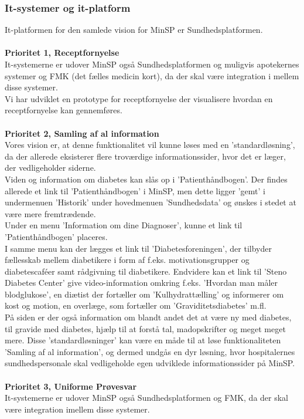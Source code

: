\subsubsection{It-systemer og it-platform}
It-platformen for den samlede vision for MinSP er Sundhedsplatformen.
\\\\
\textbf{Prioritet 1, Receptfornyelse} \\
It-systemerne er udover MinSP også Sundhedsplatformen og muligvis apotekernes systemer og FMK (det fælles medicin kort), da der skal være integration i mellem disse systemer.\\
Vi har udviklet en prototype for receptfornyelse der visualisere hvordan en receptfornyelse kan gennemføres.
\\\\
\textbf{Prioritet 2, Samling af al information} \\
%
%
Vores vision er, at denne funktionalitet vil kunne løses med en 'standardløsning', da der allerede eksisterer flere troværdige informationssider, hvor det er læger, der vedligeholder siderne. \\
Viden og information om diabetes kan slås op i 'Patienthåndbogen'. Der findes allerede et link til 'Patienthåndbogen' i MinSP, men dette ligger 'gemt' i undermenuen 'Historik' under hovedmenuen 'Sundhedsdata' og ønskes i stedet at være mere fremtrædende. 
\\ 
Under en menu 'Information om dine Diagnoser', kunne et link til 'Patienthåndbogen' placeres. \\
I samme menu kan der lægges et link til 'Diabetesforeningen', der tilbyder fællesskab mellem diabetikere i form af f.eks. motivationsgrupper og diabetescaféer samt rådgivning til diabetikere.
Endvidere kan et link til 'Steno Diabetes Center' give video-information omkring f.eks. 'Hvordan man måler blodglukose', en diætist der fortæller om 'Kulhydrattælling' og informerer om kost og motion, en overlæge, som fortæller om 'Graviditetsdiabetes' m.fl. \\
På siden er der også information om blandt andet det at være ny med diabetes, til gravide med diabetes, hjælp til at forstå tal, madopskrifter og meget meget mere. 
Disse 'standardløsninger' kan være en måde til at løse funktionaliteten 'Samling af al information', og dermed undgås en dyr løsning, hvor hospitalernes sundhedspersonale skal vedligeholde egen udviklede informationssider på MinSP.
\\\\
\textbf{Prioritet 3, Uniforme Prøvesvar} \\
It-systemerne er udover MinSP også Sundhedsplatformen og FMK, da der skal være integration imellem disse systemer.

